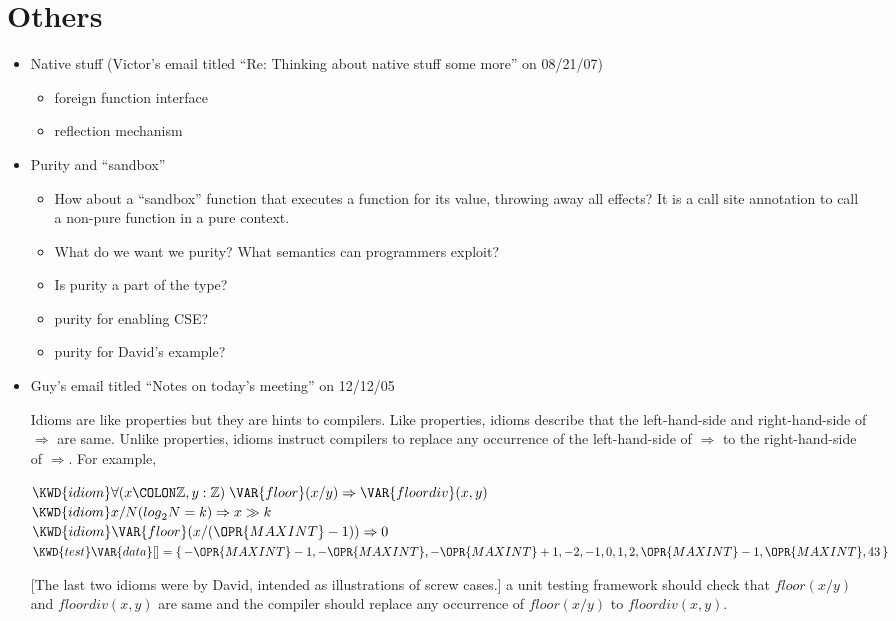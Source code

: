 \section{Others}
\begin{itemize}
\item Native stuff (Victor's email titled ``Re: Thinking about native stuff some more'' on 08/21/07)
  \begin{itemize}
  \item foreign function interface
  \item reflection mechanism
  \end{itemize}

\item Purity and ``sandbox''
  \begin{itemize}
  \item How about a ``sandbox'' function that executes a function for its
  value, throwing away all effects?  It is a call site annotation to call
  a non-pure function in a pure context.
  \item What do we want we purity?  What semantics can programmers exploit?
  \item Is purity a part of the type?
  \item purity for enabling CSE?
  \item purity for David's example?
  \end{itemize}

\item {}

Guy's email titled ``Notes on today's meeting'' on 12/12/05

Idioms are like properties but they are hints to compilers.  Like
properties, idioms describe that the left-hand-side and right-hand-side of
$\Rightarrow$ are same.  Unlike properties, idioms instruct compilers to
replace any occurrence of the left-hand-side of $\Rightarrow$ to the
right-hand-side of $\Rightarrow$.  For example,
\begin{Fortress}
\(\KWD{idiom} \forall (x\COLON \mathbb{Z}, y \mathrel{\mathtt{:}} \mathbb{Z})\; \VAR{floor}(x/y) \Rightarrow \VAR{floordiv}(x,y)\)\\
\(\KWD{idiom} x/N ({log}_{2} N=k) \Rightarrow x \gg k\)\\
\(\KWD{idiom} \VAR{floor}(x/(\OPR{MAXINT}-1)) \Rightarrow 0\)\\
\(\KWD{test} \VAR{data}[] = \{\,-\OPR{MAXINT}-1, -\OPR{MAXINT}, -\OPR{MAXINT}+1, -2, -1, 0, 1, 2, \OPR{MAXINT}-1, \OPR{MAXINT}, 43\,\} \)
\end{Fortress}
[The last two idioms were by David, intended as illustrations
of screw cases.]
a unit testing framework should check that
$floor(x/y)$ and $floordiv(x,y)$ are same and the compiler should replace
any occurrence of $floor(x/y)$ to $floordiv(x,y)$.


\end{itemize}
